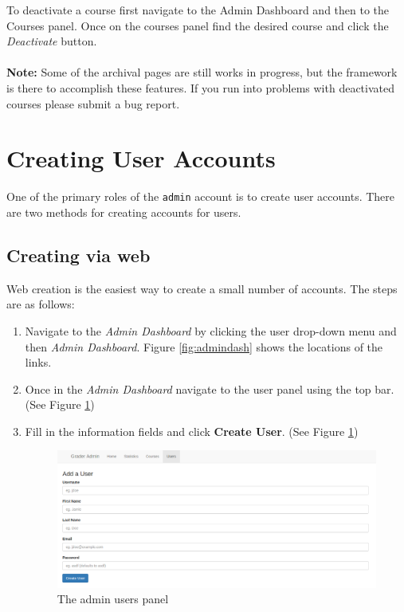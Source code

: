 \documentclass[11pt]{report}
\begin{document}
To deactivate a course first navigate to the Admin Dashboard and then to the Courses panel. Once on the courses
panel find the desired course and click the \emph{Deactivate} button.
\\
\\
\noindent\textbf{Note:} Some of the archival pages are still works in progress, but the framework is there to 
accomplish these features. If you run into problems with deactivated courses please submit a bug report.



\section{Creating User Accounts}
\label{sec:createusers}
One of the primary roles of the \texttt{admin} account is to create user accounts. There are two methods
for creating accounts for users. 

\subsection{Creating via web}
Web creation is the easiest way to create a small number of accounts. The steps are as follows:

\begin{enumerate}
\item Navigate to the \emph{Admin Dashboard} by clicking the user drop-down menu and then \emph{Admin Dashboard}. Figure \ref{fig:admindash} shows the locations of the links.

\item Once in the \emph{Admin Dashboard} navigate to the user panel using the top bar. (See Figure \ref{fig:adminuser})
\item Fill in the information fields and click \textbf{Create User}. (See Figure \ref{fig:adminuser})

\begin{figure}[h]
\centering
\includegraphics[width=\textwidth,height=\textheight,keepaspectratio]{diagrams/admin_users}
\caption{The admin users panel}
\label{fig:adminuser}
\end{figure}
\end{enumerate}
\end{document}
